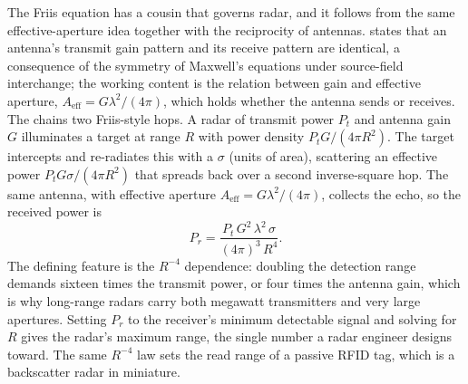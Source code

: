 \begin{mastery}
The Friis equation has a cousin that governs radar, and it follows from
the same effective-aperture idea together with the reciprocity of
antennas.  states that an antenna's transmit gain
pattern and its receive pattern are identical, a consequence of the
symmetry of Maxwell's equations under source-field interchange; the
working content is the relation between gain and effective aperture,
$A_{\text{eff}} = G\lambda^{2}/(4\pi)$, which holds whether the antenna
sends or receives. The  chains two
Friis-style hops. A radar of transmit power $P_{t}$ and antenna gain
$G$ illuminates a target at range $R$ with power density $P_{t}G/(4\pi
R^{2})$. The target intercepts and re-radiates this with a
 $\sigma$ (units of area), scattering an
effective power $P_{t}G\sigma/(4\pi R^{2})$ that spreads back over a
second inverse-square hop. The same antenna, with effective aperture
$A_{\text{eff}} = G\lambda^{2}/(4\pi)$, collects the echo, so the
received power is
\[
P_{r} = \frac{P_{t}\,G^{2}\,\lambda^{2}\,\sigma}{(4\pi)^{3}\,R^{4}}.
\]
The defining feature is the $R^{-4}$ dependence: doubling the detection
range demands sixteen times the transmit power, or four times the
antenna gain, which is why long-range radars carry both megawatt
transmitters and very large apertures. Setting $P_{r}$ to the receiver's
minimum detectable signal and solving for $R$ gives the radar's maximum
range, the single number a radar engineer designs toward. The same
$R^{-4}$ law sets the read range of a passive RFID tag, which is a
backscatter radar in miniature.
\end{mastery}

